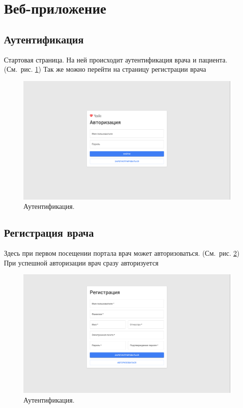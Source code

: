 \section{Веб-приложение}\label{sec:-2}

\subsection{Аутентификация}\label{subsec:}
Стартовая страница.
На ней происходит аутентификация врача и пациента.
(См.\ рис. \ref{fig:figure4})
Так же можно перейти на страницу регистрации врача
\begin{figure}[h]
    \centering
    \includegraphics[width=\textwidth]{images/screenshots/auth}
    \caption{Аутентификация.}
    \label{fig:figure4}
\end{figure}


\subsection{Регистрация врача}\label{subsec:-5}
Здесь при первом посещении портала врач может авторизоваться.
(См.\ рис. \ref{fig:figure41})
При успешной авторизации врач сразу авторизуется
\begin{figure}[h]
    \centering
    \includegraphics[width=\textwidth]{images/screenshots/doctor_registration}
    \caption{Аутентификация.}
    \label{fig:figure41}
\end{figure}


